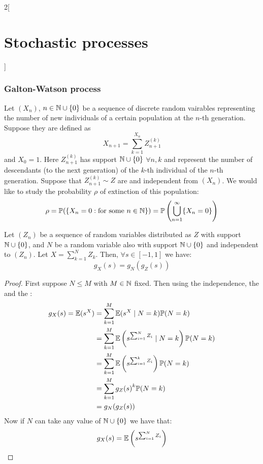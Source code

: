 \documentclass[../../../main_math.tex]{subfiles}
\begin{document}
\begin{multicols}{2}[\section{Stochastic processes}]
  \subsubsection{Galton-Watson process}
  \begin{model}\label{SP:galtonwatsonModel}
    Let $(X_n)$, $n\in\mathbb{N}\cup\{0\}$ be a sequence of discrete random vairables representing the number of new individuals of a certain population at the $n$-th generation. Suppose they are defined as $$X_{n+1}=\sum_{k=1}^{X_n}Z_{n+1}^{(k)}$$ and $X_0=1$. Here $Z_{n+1}^{(k)}$ has support $\mathbb{N}\cup\{0\}$ $\forall n,k$ and represent the number of descendants (to the next generation) of the $k$-th individual of the $n$-th generation. Suppose that $Z_{n+1}^{(k)}\sim Z$ are \iid and independent from $(X_n)$. We would like to study the probability $\rho$ of extinction of this population: $$\rho=\mathbb{P}(\{X_n=0:\text{for some $n\in\mathbb{N}$}\})=\mathbb{P}\left(\bigcup_{n=1}^\infty\{X_n=0\}\right)$$
  \end{model}
  \begin{lemma}\label{SP:lemmaGaltonWatson}
    Let $(Z_n)$ be a sequence of \iid random variables distributed as $Z$ with support $\mathbb{N}\cup\{0\}$, and $N$ be a random variable also with support $\mathbb{N}\cup\{0\}$ and independent to $(Z_n)$. Let $X=\sum_{k=1}^NZ_k$. Then, $\forall s\in[-1,1]$ we have: $$g_X(s)=g_N(g_Z(s))$$
  \end{lemma}
  \begin{proof}
    First suppose $N\leq M$ with $M\in\mathbb{N}$ fixed. Then using the independence, the  and the :
    \begin{align*}
      g_X(s)=\mathbb{E}(s^X) & =\sum_{k=1}^M\mathbb{E}(s^X\mid N=k)\mathbb{P}(N=k)                                        \\
                       & = \sum_{k=1}^{M} \mathbb{E}\left(s^{\sum_{i=1}^{N}Z_i} \mid N = k\right) \mathbb{P}(N = k) \\
                       & = \sum_{k=1}^{M} \mathbb{E}\left(s^{\sum_{i=1}^{k}Z_i}\right) \mathbb{P}(N = k)            \\
                       & = \sum_{k=1}^{M} {g_Z(s)}^k \mathbb{P}(N = k)                                        \\
                       & = g_N(g_Z(s))
    \end{align*}
    Now if $N$ can take any value of $\mathbb{N}\cup\{0\}$ we have that:
    \begin{align*}
      g_X(s) & =\Exp\left(s^{\sum_{i=1}^{N}Z_i}\right)                          \\

\end{align*}
\end{proof}
\end{multicols}
\end{document}
